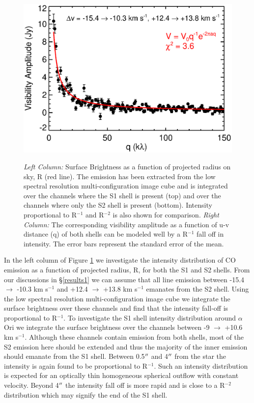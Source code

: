 \documentclass[iop]{emulateapj}
\begin{document}
\begin{figure}[hbt!]
{          \includegraphics[scale=0.50]{f17.eps}
          }
\\
\caption{\textit{Left Column:} Surface Brightness as a function of projected radius on sky, R (red line). The emission has been extracted from the low spectral resolution multi-configuration image cube and is integrated over the channels where the S1 shell is present (top) and over the channels where only the S2 shell is present (bottom). Intensity proportional to R${}^{-1}$ and R${}^{-2}$ is also shown for comparison. \textit{Right Column:} The corresponding visibility amplitude as a function of u-v distance (q) of both shells can be modeled well by a R${}^{-1}$ fall off in intensity. The error bars represent the standard error of the mean.}
\label{fig:fig6}
\end{figure}

In the left column of Figure \ref{fig:fig6} we investigate the intensity distribution of CO emission as a function of projected radius, R, for both the S1 and S2 shells. From our discussions in \S \ref{results1} we can assume that all line emission between -15.4 $\rightarrow$ -10.3 km s${}^{-1}$ and +12.4 $\rightarrow$ +13.8 km s${}^{-1}$ emanates from the S2 shell. Using the low spectral resolution multi-configuration image cube we integrate the surface brightness over these channels and find that the intensity fall-off is proportional to R${}^{-1}$. To investigate the S1 shell intensity distribution around $\alpha$ Ori we integrate the surface brightness over the channels between -9 $\rightarrow$ +10.6 km s${}^{-1}$. Although these channels contain emission from both shells, most of the S2 emission here should be extended and thus the majority of the inner emission should emanate from the S1 shell.  Between 0.5$\mbox{$^{\prime\prime}$}$ and 4$\mbox{$^{\prime\prime}$}$ from the star the intensity is again found to be proportional to R${}^{-1}$. Such an intensity distribution is expected for an optically thin homogeneous spherical outflow with constant velocity. Beyond 4$\mbox{$^{\prime\prime}$}$ the intensity fall off is more rapid and is close to a R${}^{-2}$ distribution which may signify the end of the S1 shell. 
\end{document}
